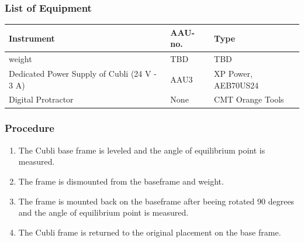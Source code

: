 \subsubsection{List of Equipment}
\begin{table}[H]
	\begin{tabular}{|l|l|p{4.3cm}|}
		\hline%
		\textbf{Instrument}                                  &  \textbf{AAU-no.}  &  \textbf{Type}                       \\
		\hline%
		weight                                           &  TBD           &  TBD		                   \\
		\hline%
		Dedicated Power Supply of Cubli \small{(24 V - 3 A)} &  AAU3                   &  XP Power, AEB70US24                 \\
		\hline%
		Digital Protractor                                   &  None               & CMT Orange Tools     \\
		\hline%
	\end{tabular}
\end{table}
\subsubsection{Procedure}
\begin{enumerate}
	\item The Cubli base frame is leveled and the angle of equilibrium point is measured.
	\item The frame is dismounted from the baseframe and weight.
	\item The frame is mounted back on the baseframe after beeing rotated 90 degrees and the angle of equilibrium point is measured.
	\item The Cubli frame is returned to the original placement on the base frame.
\end{enumerate}


